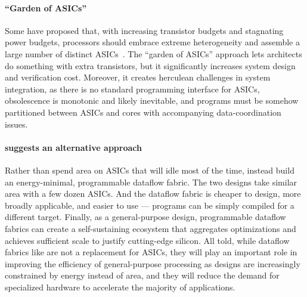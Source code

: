 \paragraph{``Garden of ASICs''}
Some have proposed that, with increasing transistor budgets and
stagnating power budgets, processors should embrace extreme
heterogeneity and assemble a large number of distinct
ASICs~\cite{venkatesh2010conservation,taylor2012dark}.
%
The ``garden of ASICs'' approach lets architects do something
with extra transistors, but it significantly increases
system design and verification cost.
%
Moreover, it creates herculean
challenges in system integration,
%
as there is no standard programming interface for ASICs,
obsolescence is monotonic and likely inevitable,
and programs must be somehow partitioned between ASICs
and cores with accompanying data-coordination issues.

\paragraph{\riptide suggests an alternative approach}
%
Rather than spend area on ASICs that will idle most of the time,
instead build an energy-minimal, programmable dataflow fabric.
%
The two designs take similar area with a few dozen ASICs.
%
And the dataflow fabric is cheaper to design, more broadly applicable,
and easier to use --- programs can be simply compiled for a
different target.
%
Finally, as a general-purpose design, programmable dataflow fabrics
can create a self-sustaining ecosystem that aggregates optimizations
and achieves sufficient scale to justify cutting-edge silicon.
%
All told, while dataflow fabrics like \riptide are not a replacement
for ASICs, they will play an important role in
improving the efficiency of general-purpose processing
as designs are increasingly constrained by energy instead of area,
and they will reduce the demand for specialized hardware to accelerate
the majority of applications.

